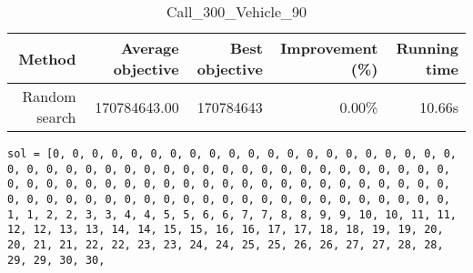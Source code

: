 \begin{table}[ht]
\centering
\caption{Call\_300\_Vehicle\_90}
\label{tab:call300vehicle90}
\begin{tabular}{|r|r|r|r|r|}
Method & Average objective & Best objective & Improvement (\%) & Running time \\
\hline
Random search & 170784643.00 & 170784643 & 0.00\% & 10.66s\\
\end{tabular}%
\end{table}
\begin{lstlisting}[label={lst:call300vehicle90},caption=Optimal solution call\_300\_vehicle\_90]
sol = [0, 0, 0, 0, 0, 0, 0, 0, 0, 0, 0, 0, 0, 0, 0, 0, 0, 0, 0, 0, 0, 0, 0, 0, 0, 0, 0, 0, 0, 0, 0, 0, 0, 0, 0, 0, 0, 0, 0, 0, 0, 0, 0, 0, 0, 0, 0, 0, 0, 0, 0, 0, 0, 0, 0, 0, 0, 0, 0, 0, 0, 0, 0, 0, 0, 0, 0, 0, 0, 0, 0, 0, 0, 0, 0, 0, 0, 0, 0, 0, 0, 0, 0, 0, 0, 0, 0, 0, 0, 0, 1, 1, 2, 2, 3, 3, 4, 4, 5, 5, 6, 6, 7, 7, 8, 8, 9, 9, 10, 10, 11, 11, 12, 12, 13, 13, 14, 14, 15, 15, 16, 16, 17, 17, 18, 18, 19, 19, 20, 20, 21, 21, 22, 22, 23, 23, 24, 24, 25, 25, 26, 26, 27, 27, 28, 28, 29, 29, 30, 30,

\end{lstlisting}
